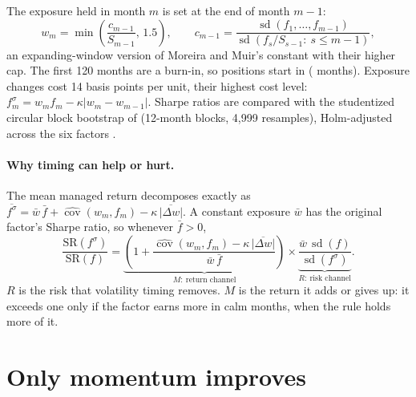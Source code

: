 \documentclass[11pt]{article}
\begin{document}
The exposure held in month $m$ is set at the end of month $m-1$:
\begin{equation}
w_m=\min\!\left(\frac{c_{m-1}}{S_{m-1}},\,1.5\right),\qquad
c_{m-1}=\frac{\operatorname{sd}\left(f_1,\dots,f_{m-1}\right)}{\operatorname{sd}\left(f_s/S_{s-1}:\ s\le m-1\right)},
\end{equation}
an expanding-window version of Moreira and Muir's constant with their higher cap. The first 120 months are a burn-in, so positions start in \RTstart{} (\RTmonths{} months). Exposure changes cost 14 basis points per unit, their highest cost level: $f^{\sigma}_m=w_m f_m-\kappa\left|w_m-w_{m-1}\right|$. Sharpe ratios are compared with the studentized circular block bootstrap of \citet{ledoit2008} (12-month blocks, 4,999 resamples), Holm-adjusted across the six factors \citep{holm1979}.

\paragraph{Why timing can help or hurt.} The mean managed return decomposes exactly as $\overline{f^\sigma}=\bar w\,\bar f+\widehat{\operatorname{cov}}(w_m,f_m)-\kappa\,\overline{|\Delta w|}$. A constant exposure $\bar w$ has the original factor's Sharpe ratio, so whenever $\bar f>0$,
\begin{equation}
\frac{\mathrm{SR}(f^\sigma)}{\mathrm{SR}(f)}=
\underbrace{\left(1+\frac{\widehat{\operatorname{cov}}(w_m,f_m)-\kappa\,\overline{|\Delta w|}}{\bar w\,\bar f}\right)}_{M:\ \text{return channel}}
\times
\underbrace{\frac{\bar w\,\operatorname{sd}(f)}{\operatorname{sd}(f^\sigma)}}_{R:\ \text{risk channel}} .
\label{eq:channels}
\end{equation}
$R$ is the risk that volatility timing removes. $M$ is the return it adds or gives up: it exceeds one only if the factor earns more in calm months, when the rule holds more of it.

\section{Only momentum improves}
\end{document}
